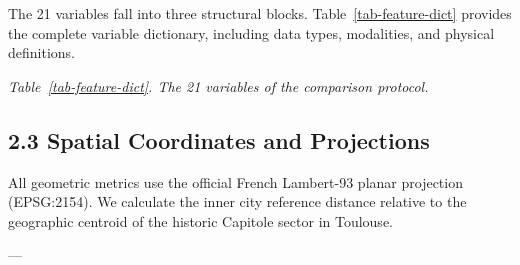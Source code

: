 The 21 variables fall into three structural blocks. Table~\ref{tab-feature-dict} provides the complete variable dictionary, including data types, modalities, and physical definitions.

\emph{Table~\ref{tab-feature-dict}. The 21 variables of the comparison protocol.}



\subsection{2.3 Spatial Coordinates and Projections}

All geometric metrics use the official French Lambert-93 planar projection (EPSG:2154). We calculate the inner city reference distance relative to the geographic centroid of the historic Capitole sector in Toulouse.

---
